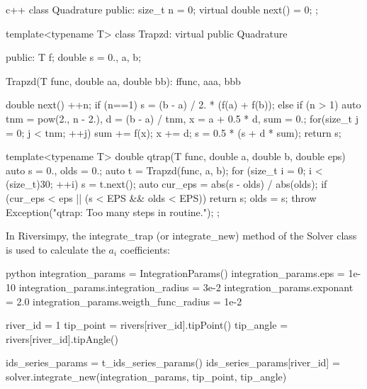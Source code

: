 \documentclass[]{pracamgr}
\begin{document}
      \begin{mintedbox}{c++}
        class Quadrature {
            public:
                size_t n = 0;
                virtual double next() = 0; };

        template<typename T> class Trapzd: virtual public Quadrature {
            public:
                T f;
                double s = 0., a, b;

                Trapzd(T func, double aa, double bb):
                    f{func}, a{aa}, b{bb} {}

                double next(){
                    ++n;
                    if (n==1) s = (b - a) / 2. * (f(a) + f(b));
                    else if (n > 1) {
                        auto tnm = pow(2., n - 2.), d = (b - a) / tnm, x = a + 0.5 * d, sum = 0.;
                        for(size_t j = 0; j < tnm; ++j) {
                            sum += f(x); x += d;
                        }
                        s = 0.5 * (s + d * sum);
                    }
                    return s;
                }
        }
        
        template<typename T> double qtrap(T func, double a, double b, double eps){
            auto s = 0., olds = 0.;
            auto t = Trapzd(func, a, b);
            for (size_t i = 0; i < (size_t)30; ++i) {
                s = t.next();
                auto cur_eps = abs(s - olds) / abs(olds);
                if (cur_eps < eps || (s < EPS && olds < EPS))
                    return s;
                olds = s;
            }
            throw Exception("qtrap: Too many steps in routine.");
        };\end{mintedbox}

        In Riversimpy, the integrate\_trap (or integrate\_new) method of the Solver class is used to calculate the $a_i$ coefficients:
        
        \begin{mintedbox}{python}
          integration_params = IntegrationParams()
          integration_params.eps = 1e-10
          integration_params.integration_radius = 3e-2
          integration_params.exponant = 2.0
          integration_params.weigth_func_radius = 1e-2        
          
          river_id = 1
          tip_point = rivers[river_id].tipPoint()
          tip_angle = rivers[river_id].tipAngle()

          ids_series_params = t_ids_series_params()
          ids_series_params[river_id] = solver.integrate_new(integration_params, tip_point, tip_angle)\end{mintedbox}
\end{document}
